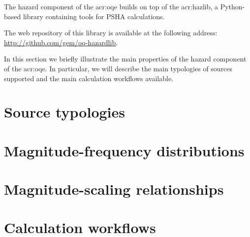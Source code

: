 
The hazard component of the \glsdesc{acr:oqe} builds on top of the
\gls{acr:hazlib}, a Python-based library containing tools for PSHA
calculations.

The web repository of this library is available at the following address:\\
\href{http://github.com/gem/oq-hazardlib}{http://github.com/gem/oq-hazardlib}.

In this section we briefly illustrate the main properties of the hazard
component of the \glsdesc{acr:oqe}. In particular, we will describe the main typologies of sources supported and the main calculation workflows available.


\section{Source typologies}
\label{sec:source_typologies}


\section{Magnitude-frequency distributions}
\label{sec:mfd_list}


\section{Magnitude-scaling relationships}
\label{sec:msr_list}


\section{Calculation workflows}
\label{sec:hazard_calculators}

